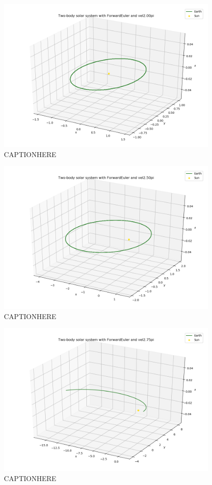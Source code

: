 \documentclass{article}
\begin{document}
    \begin{figure}[H]
        \centering
        \includegraphics[width = 11cm]{img/plot3D_S_E_F_vel200pi.png}
        \caption{CAPTIONHERE}
        \label{fig:plot3D_S_E_F_vel200pi}
    \end{figure}

    \begin{figure}[H]
        \centering
        \includegraphics[width = 11cm]{img/plot3D_S_E_F_vel250pi.png}
        \caption{CAPTIONHERE}
        \label{fig:plot3D_S_E_F_vel250pi}
    \end{figure}

    \begin{figure}[H]
        \centering
        \includegraphics[width = 11cm]{img/plot3D_S_E_F_vel275pi.png}
        \caption{CAPTIONHERE}
        \label{fig:plot3D_S_E_F_vel275pi}
    \end{figure}
\end{document}
